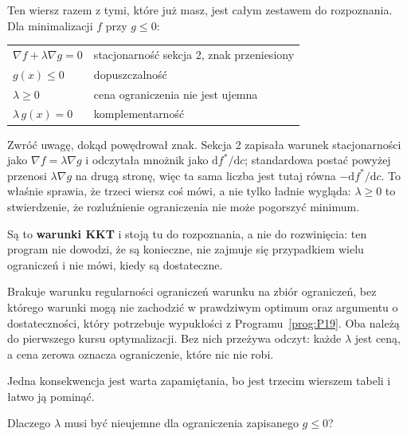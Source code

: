 \begin{fr}
Ten wiersz razem z tymi, które już masz, jest całym zestawem do rozpoznania. Dla
minimalizacji $f$ przy $g \le 0$:

\begin{center}
\begin{tabular}{ll}
\toprule
$\nabla f + \lambda \nabla g = 0$ & stacjonarność \dash{} sekcja 2, znak przeniesiony \\
$g(x) \le 0$ & dopuszczalność \\
$\lambda \ge 0$ & cena ograniczenia nie jest ujemna \\
$\lambda\, g(x) = 0$ & komplementarność \\
\bottomrule
\end{tabular}
\end{center}

Zwróć uwagę, dokąd powędrował znak. Sekcja 2 zapisała warunek stacjonarności
jako $\nabla f = \lambda \nabla g$ i odczytała mnożnik jako
$\mathrm{d}f^{*}/\mathrm{d}c$; standardowa postać powyżej przenosi
$\lambda \nabla g$ na drugą stronę, więc ta sama liczba jest tutaj równa
$-\mathrm{d}f^{*}/\mathrm{d}c$. To właśnie sprawia, że trzeci wiersz coś mówi,
a nie tylko ładnie wygląda: $\lambda \ge 0$ to stwierdzenie, że rozluźnienie
ograniczenia nie może pogorszyć minimum.

Są to \textbf{warunki KKT} i stoją tu do rozpoznania, a nie do rozwinięcia: ten
program nie dowodzi, że są konieczne, nie zajmuje się przypadkiem wielu
ograniczeń i nie mówi, kiedy są dostateczne.

\begin{rigourbox}
Brakuje warunku regularności ograniczeń \dash{} warunku na zbiór ograniczeń, bez
którego warunki mogą nie zachodzić w prawdziwym optimum \dash{} oraz argumentu
o dostateczności, który potrzebuje wypukłości z Programu~\ref{prog:P19}. Oba
należą do pierwszego kursu optymalizacji. Bez nich przeżywa odczyt: każde
$\lambda$ jest ceną, a cena zerowa oznacza ograniczenie, które nic nie robi.
\end{rigourbox}
\end{fr}

\begin{fr}
Jedna konsekwencja jest warta zapamiętania, bo jest trzecim wierszem tabeli i
łatwo ją pominąć.

Dlaczego $\lambda$ musi być nieujemne dla ograniczenia zapisanego $g \le 0$?
\nextframe
\end{fr}

